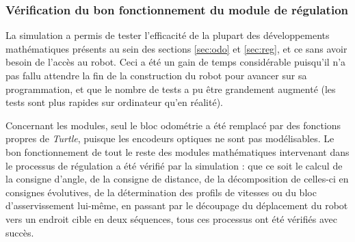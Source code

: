 \documentclass[a4paper,11pt]{article}
\begin{document}
\subsubsection{Vérification du bon fonctionnement du module de régulation}

La simulation a permis de tester l'efficacité de la plupart des développements mathématiques présents au sein des sections \ref{sec:odo} et \ref{sec:reg}, et ce sans avoir besoin de l'accès au robot. Ceci a été un gain de temps considérable puisqu'il n'a pas fallu attendre la fin de la construction du robot pour avancer sur sa programmation, et que le nombre de tests a pu être grandement augmenté (les tests sont plus rapides sur ordinateur qu'en réalité).

Concernant les modules, seul le bloc odométrie a été remplacé par des fonctions propres de \textit{Turtle}, puisque les encodeurs optiques ne sont pas modélisables. Le bon fonctionnement de tout le reste des modules mathématiques intervenant dans le processus de régulation a été vérifié par la simulation : que ce soit le calcul de la consigne d'angle, de la consigne de distance, de la décomposition de celles-ci en consignes évolutives, de la détermination des profils de vitesses ou du bloc d'asservissement lui-même, en passant par le découpage du déplacement du robot vers un endroit cible en deux séquences, tous ces processus ont été vérifiés avec succès.
\end{document}
